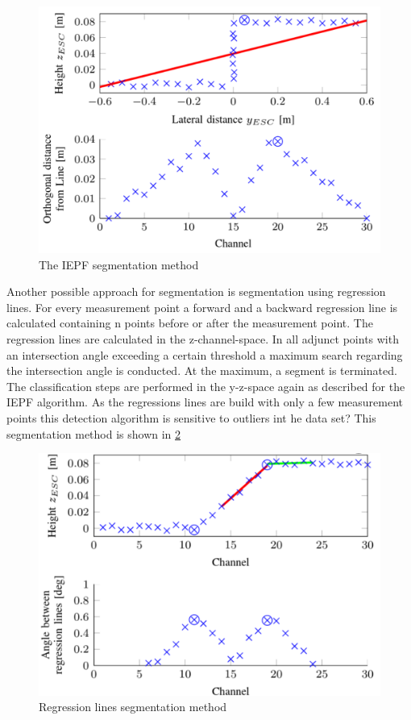 \begin{figure}[ht]
	\centering
   \includegraphics[scale = 0.35]{pictures/iepf.pdf}
	\caption{The IEPF segmentation method  \cite{lidar13}}
	\label{fig2}
\end{figure}
 

Another possible approach for segmentation is segmentation using regression lines. For every measurement point a forward and a backward regression line is calculated containing n points before or after the measurement point. The regression lines are calculated in the z-channel-space.  In all adjunct points with an intersection angle exceeding a certain threshold a maximum search regarding the intersection angle is conducted. At the maximum, a segment is terminated. The classification steps are performed in the y-z-space again as described for the IEPF algorithm. As the regressions lines are build with only a few measurement points this detection algorithm is sensitive to outliers int he data set? This segmentation method is shown in \ref{fig3}

\begin{figure}[H]
	\centering
  	\includegraphics[scale = 0.5]{pictures/iepf2.pdf}
	\caption{Regression lines segmentation method  \cite{lidar13}}
	\label{fig3}
\end{figure}

